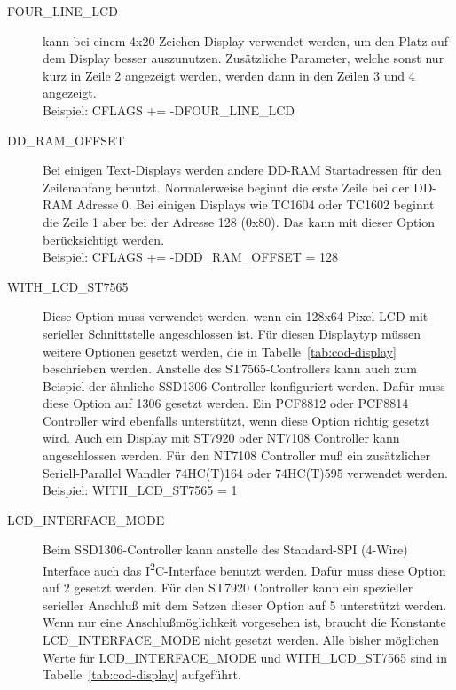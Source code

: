 \begin{description}
  \item[FOUR\_LINE\_LCD] kann bei einem 4x20-Zeichen-Display verwendet werden, um den Platz auf dem Display
besser auszunutzen. Zusätzliche Parameter, welche sonst nur kurz in Zeile 2 angezeigt werden, werden dann in
den Zeilen 3 und 4 angezeigt.\\
Beispiel: CFLAGS += -DFOUR\_LINE\_LCD

  \item[DD\_RAM\_OFFSET] Bei einigen Text-Displays werden andere DD-RAM Startadressen für den Zeilenanfang
benutzt. Normalerweise beginnt die erste Zeile bei der DD-RAM Adresse 0. Bei einigen Displays wie TC1604
oder TC1602 beginnt die Zeile 1 aber bei der Adresse 128 (0x80).
Das kann mit dieser Option berücksichtigt werden.\\
Beispiel: CFLAGS += -DDD\_RAM\_OFFSET = 128

  \item[WITH\_LCD\_ST7565] Diese Option muss verwendet werden, wenn ein 128x64 Pixel LCD mit serieller
Schnittstelle angeschlossen ist.
Für diesen Displaytyp müssen weitere Optionen gesetzt werden, die in Tabelle~\ref{tab:cod-display} 
beschrieben werden.
Anstelle des ST7565-Controllers kann auch zum Beispiel der ähnliche SSD1306-Controller konfiguriert werden.
Dafür muss diese Option auf 1306 gesetzt werden.
Ein PCF8812 oder PCF8814 Controller wird ebenfalls unterstützt, wenn diese Option richtig gesetzt wird.
Auch ein Display mit ST7920 oder NT7108 Controller kann angeschlossen werden.
Für den NT7108 Controller muß ein
zusätzlicher Seriell-Parallel Wandler 74HC(T)164 oder 74HC(T)595 verwendet werden.\\
Beispiel: WITH\_LCD\_ST7565 = 1 

 \item[LCD\_INTERFACE\_MODE] Beim SSD1306-Controller kann anstelle des Standard-SPI (4-Wire) Interface auch das
I\textsuperscript{2}C-Interface benutzt werden. Dafür muss diese Option auf 2 gesetzt werden.
Für den ST7920 Controller kann ein spezieller serieller Anschluß mit dem Setzen dieser Option auf 5
unterstützt werden.
Wenn nur eine Anschlußmöglichkeit vorgesehen ist, braucht die Konstante LCD\_INTERFACE\_MODE nicht gesetzt werden.
Alle bisher möglichen Werte für LCD\_INTERFACE\_MODE und WITH\_LCD\_ST7565 sind in Tabelle~\ref{tab:cod-display} aufgeführt.\\


\end{description}
